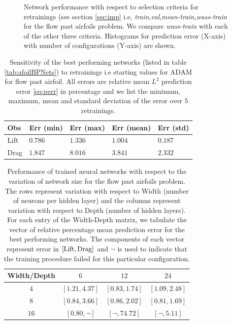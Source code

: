 \documentclass[a4paper]{article}
\numberwithin{equation}{section}
\numberwithin{equation}{section}
\theoremstyle{definition}
\theoremstyle{myremarkstyle}
\begin{document}
\begin{figure}[htbp]
\caption{Network performance with respect to selection criteria for retrainings (see section \ref{sec:imp} i.e, \emph{train,val,mean-train,wass-train} for the flow past airfoils problem. We compare \emph{wass-train} with each of the other three criteria. Histograms for prediction error (X-axis) with number of configurations (Y-axis) are shown.}
\label{fig:afoilselect}
\end{figure}
\begin{table}[htbp]
\centering
\begin{tabular}{|l|l|l|l|l|}
\hline
Obs & Err (min) & Err (max) & Err (mean) & Err (std) \\
\hline
Lift  & $0.786$ & $1.336$ & $1.004$ & $0.187$ \\
\hline
Drag & $1.847$ & $8.016$ & $3.841$ & $2.332$ \\
\hline
\end{tabular}
\caption{Sensitivity of the best performing networks (listed in table \ref{tab:afoilBPNets}) to retrainings i.e starting values for ADAM for flow past airfoil. All errors are relative mean $L^2$ prediction error \eqref{eq:perr} in percentage and we list the minimum, maximum, mean and standard deviation of the error over $5$ retrainings.}
\label{tab:afoilretrain}
\end{table}
\begin{table}[htbp]
\centering
\begin{tabular}{|c|c|c|c|}
\hline
Width/Depth  & $6$  & $12$ & $24$ \\
\hline
$4$      & $\left[1.21,4.37 \right]$ &  $\left[0.83,1.74\right]$ &  $\left[1.09,2.48\right]$ \\
\hline 
$8$      & $\left[0.84,3.66 \right]$ &  $\left[0.86,2.02\right]$ &  $\left[0.81,1.69\right]$ \\
\hline
$16$      & $\left[0.80,\neg \right]$ &  $\left[\neg, 74.72\right]$ &  $\left[\neg,5.11\right]$ \\
\hline
\end{tabular}
\caption{Performance of trained neural networks with respect to the variation of network size for the flow past airfoils problem. The rows represent variation with respect to Width (number of neurons per hidden layer) and the 
columns represent variation with respect to Depth (number of hidden layers). For each entry of the Width-Depth matrix, we tabulate the vector of relative percentage mean prediction error for the best performing networks. The components of each vector represent error in $\left[{\rm Lift}, {\rm Drag} \right]$ and $\neg$ is used to indicate that the training procedure failed for this particular configuration.}
\label{tab:afoilNS}
\end{table}
\end{document}
